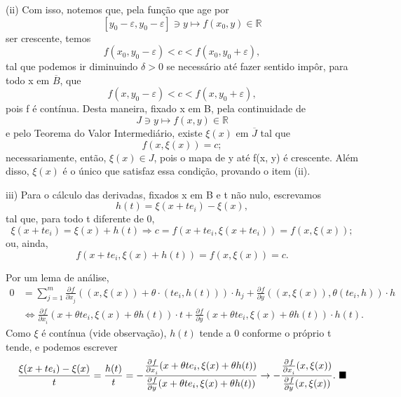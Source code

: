 \documentclass[../differential_topology.tex]{subfiles}
\begin{document}
\begin{tcolorbox}
\begin{proof*}
		(ii) Com isso, notemos que, pela função que age por
		\[
			[y_{0}-\varepsilon , y_{0}-\varepsilon ]\ni y \mapsto f(x_{0}, y)\in \mathbb{R}
		\]
		ser crescente, temos
		\[
			f(x_{0}, y_{0}-\varepsilon ) < c < f(x_{0}, y_{0}+\varepsilon ),
		\]
		tal que podemos ir diminuindo \(\delta  > 0\) se necessário até fazer sentido impôr, para todo x em \(\overline{B}\), que
		\[
			f(x, y_{0}-\varepsilon ) < c < f(x, y_{0}+\varepsilon ),
		\]
		pois f é contínua. Desta maneira, fixado x em B, pela continuidade de
		\[
			J\ni y \mapsto f(x, y)\in \mathbb{R}
		\]
		e pelo Teorema do Valor Intermediário, existe \(\xi (x)\) em \(\overline{J}\) tal que
		\[
			f(x, \xi (x)) = c;
		\]
		necessariamente, então, \(\xi (x)\in J\), pois o mapa de y até f(x, y) é crescente. Além disso, \(\xi (x)\) é o único que satisfaz essa condição, provando o item (ii).

		iii) Para o cálculo das derivadas, fixados x em B e t não nulo, escrevamos
		\[
			h(t) = \xi (x+te_{i}) - \xi (x),
		\]
		tal que, para todo t diferente de 0,
		\[
			\xi (x + t e_{i}) = \xi (x) + h(t) \Rightarrow c = f(x+t e_{i}, \xi (x + t e_{i})) = f(x, \xi (x));
		\]
		ou, ainda,
		\[
			f(x+t e_{i}, \xi (x) + h(t)) = f(x, \xi (x)) = c.
		\]

		Por um lema de análise,
		\begin{align*}
			0 & = \sum\limits_{j=1}^{m}\frac{\partial^{}f}{\partial x_{j}^{}}((x, \xi (x)) + \theta \cdot (te_{i}, h(t)))\cdot h_{j} + \frac{\partial^{}f}{\partial y^{}}((x, \xi (x)), \theta (t e_{i}, h))\cdot h  \\
			  & \Longleftrightarrow \frac{\partial^{}f}{\partial x_{i}^{}}(x+\theta t e_{i}, \xi (x) + \theta h(t)) \cdot t + \frac{\partial^{}f}{\partial y^{}}(x+\theta t e_{i}, \xi (x) + \theta h(t))\cdot h(t).
		\end{align*}
		Como \(\xi \) é contínua (vide observação), \(h(t)\) tende a 0 conforme o próprio t tende, e podemos escrever
		\[
			\frac{\xi (x + te_{i})-\xi (x)}{t} = \frac{h(t)}{t} = - \frac{\frac{\partial^{}f}{\partial x_{i}^{}}(x+\theta t e_{i}, \xi (x) + \theta h(t))}{\frac{\partial^{}f}{\partial y^{}}(x + \theta te_{i}, \xi (x) + \theta h(t))} \rightarrow -\frac{\frac{\partial^{}f}{\partial x_{i}^{}}(x, \xi (x))}{\frac{\partial^{}f}{\partial y^{}}(x, \xi (x))}. \text{ $\blacksquare$}
		\]
	\end{proof*}

\end{tcolorbox}
\end{document}
